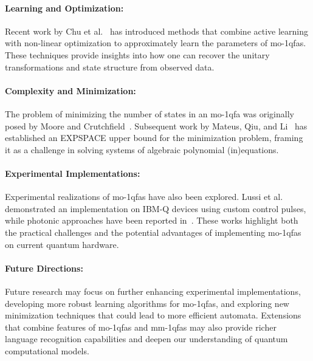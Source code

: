 \paragraph{Learning and Optimization:} Recent work by Chu et al.~\cite{10.1007/978-3-031-35257-7_16} has introduced methods that combine active learning with non-linear optimization to approximately learn the parameters of \gls{mo-1qfa}s. These techniques provide insights into how one can recover the unitary transformations and state structure from observed data.

\paragraph{Complexity and Minimization:} The problem of minimizing the number of states in an \gls{mo-1qfa} was originally posed by Moore and Crutchfield~\cite{moore2000quantum}. Subsequent work by Mateus, Qiu, and Li~\cite{MATEUS201236} has established an EXPSPACE upper bound for the minimization problem, framing it as a challenge in solving systems of algebraic polynomial (in)equations.

\paragraph{Experimental Implementations:} Experimental realizations of \gls{mo-1qfa}s have also been explored. Lussi et al.~\cite{lussi2024implementingquantumfiniteautomaton} demonstrated an implementation on IBM-Q devices using custom control pulses, while photonic approaches have been reported in~\cite{app11188768}. These works highlight both the practical challenges and the potential advantages of implementing \gls{mo-1qfa}s on current quantum hardware.

\paragraph{Future Directions:} Future research may focus on further enhancing experimental implementations, developing more robust learning algorithms for \gls{mo-1qfa}s, and exploring new minimization techniques that could lead to more efficient automata. Extensions that combine features of \gls{mo-1qfa}s and \gls{mm-1qfa}s may also provide richer language recognition capabilities and deepen our understanding of quantum computational models.

